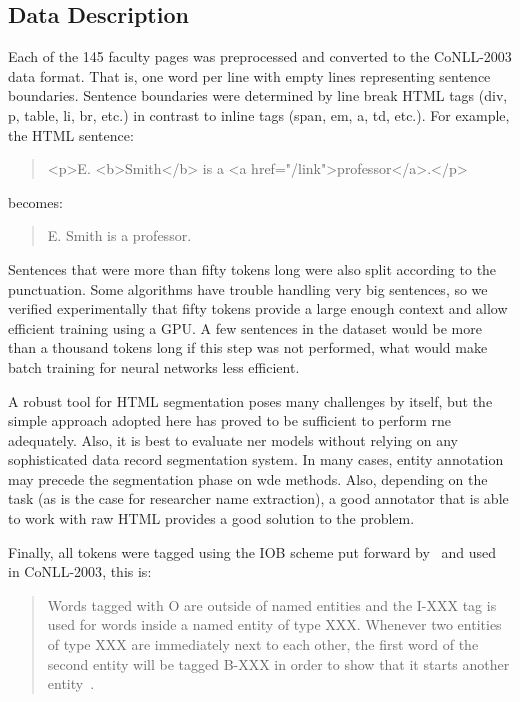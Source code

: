 \documentclass{nle}
\begin{document}
\subsection{Data Description} 
\label{sec:data_description}

Each of the 145 faculty pages was preprocessed and converted
to the {CoNLL-2003} data format. That is, one word per line with empty lines representing
sentence boundaries. Sentence boundaries were determined by line break HTML tags
(div, p, table, li, br, etc.) in contrast to inline tags (span, em, a, td, etc.). For example,
the HTML sentence: 
%
\begin{quote}
\centering
<p>E. <b>Smith</b> is a <a href="/link">professor</a>.</p>
\end{quote}
%
\noindent
becomes:
%
\begin{quote}
\centering
E. Smith is a professor.
\end{quote}
%
Sentences that were more than fifty tokens long were also split according to the
punctuation. Some algorithms have trouble handling very big sentences, so we verified
experimentally that fifty tokens provide a large enough context 
and allow efficient training using a GPU. A few sentences in the dataset would be 
more than a thousand tokens long if this step was not performed, what would make batch training
for neural networks less efficient.


A robust tool for HTML segmentation poses many challenges by itself, but the simple approach 
adopted here has proved to be sufficient to perform \gls{rne} adequately. 
Also, it is best to evaluate \gls{ner} models without relying on any sophisticated data 
record segmentation system.
In many cases, entity annotation may precede the segmentation
phase on \gls{wde} methods. Also, depending on the task (as is the case
for researcher name extraction), a good annotator that is able to work 
with raw HTML provides a good solution to the problem.

Finally, all tokens were tagged using the IOB scheme put forward by~\cite{Ramshaw1999}
and used in {CoNLL-2003}, this is:

\begin{quote}
Words tagged with O are outside of named entities
and the I-XXX tag is used for words inside a
named entity of type XXX. Whenever two entities of
type XXX are immediately next to each other, the
first word of the second entity will be tagged B-XXX
in order to show that it starts another entity~\cite{KimSang2003}.
\end{quote}
\end{document}
